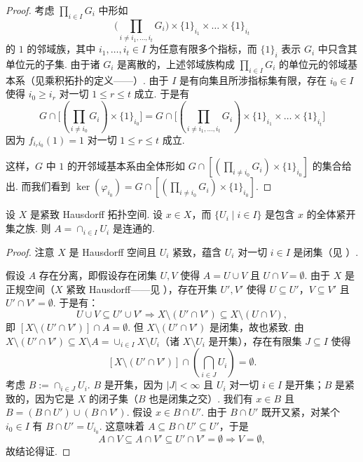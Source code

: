 \begin{proof}
考虑 $\prod_{i\in I}G_i$ 中形如
\[
\bigl(\prod_{i\neq i_1,\ldots,i_t}G_i\bigr)\times\{1\}_{i_1}\times\ldots\times\{1\}_{i_t}
\]
的 $1$ 的邻域族，其中 $i_1,\ldots,i_t\in I$ 为任意有限多个指标，而 $\{1\}_i$ 表示 $G_i$ 中只含其单位元的子集. 由于诸 $G_i$ 是离散的，上述邻域族构成 $\prod_{i\in I}G_i$ 的单位元的邻域基本系（见乘积拓扑的定义——\cite[\S19]{mun75}）. 由于 $I$ 是有向集且所涉指标集有限，存在 $i_0\in I$ 使得 $i_0\geq i_r$ 对一切 $1\leq r\leq t$ 成立. 于是有
\[
G\cap\bigl[(\prod_{i\neq i_0}G_i)\times\{1\}_{i_0}\bigr]=G\cap\bigl[(\prod_{i\neq i_1,\ldots,i_t}G_i)\times\{1\}_{i_1}\times\ldots\times\{1\}_{i_t}\bigr]
\]
因为 $f_{i_ri_0}(1)=1$ 对一切 $1\leq r\leq t$ 成立.

这样，$G$ 中 $1$ 的开邻域基本系由全体形如 $G\cap[(\prod_{i\neq i_0}G_i)\times\{1\}_{i_0}]$ 的集合给出. 而我们看到 $\ker(\varphi_{i_0})=G\cap[(\prod_{i\neq i_0}G_i)\times\{1\}_{i_0}]$.
\end{proof}

\begin{lemma}\label{c3-lem-2-2}
设 $X$ 是紧致 Hausdorff 拓扑空间. 设 $x\in X$，而 $\{U_i\mid i\in I\}$ 是包含 $x$ 的全体紧开集之族. 则 $A=\cap_{i\in I}U_i$ 是连通的.
\end{lemma}

\begin{proof}
注意 $X$ 是 Hausdorff 空间且 $U_i$ 紧致，蕴含 $U_i$ 对一切 $i\in I$ 是闭集（见 \cite[Theorem~26.3]{mun75}）.

假设 $A$ 存在分离，即假设存在闭集 $U,V$ 使得 $A=U\cup V$ 且 $U\cap V=\emptyset$. 由于 $X$ 是正规空间（$X$ 紧致 Hausdorff——见 \cite[Theorem~32.3]{mun75}），存在开集 $U',V'$ 使得 $U\subseteq U'$，$V\subseteq V'$ 且 $U'\cap V'=\emptyset$. 于是有：
\[
U\cup V\subseteq U'\cup V'\Rightarrow X\setminus(U'\cap V')\subseteq X\setminus(U\cap V),
\]
即 $[X\setminus(U'\cap V')]\cap A=\emptyset$. 但 $X\setminus(U'\cap V')$ 是闭集，故也紧致. 由 $X\setminus(U'\cap V')\subseteq X\setminus A=\cup_{i\in I}X\setminus U_i$（诸 $X\setminus U_i$ 是开集），存在有限集 $J\subseteq I$ 使得
\[
[X\setminus(U'\cap V')]\cap(\bigcap_{i\in J}U_i)=\emptyset.
\]
考虑 $B:=\cap_{i\in J}U_i$. $B$ 是开集，因为 $|J|<\infty$ 且 $U_i$ 对一切 $i\in I$ 是开集；$B$ 是紧致的，因为它是 $X$ 的闭子集（$B$ 也是闭集之交）. 我们有 $x\in B$ 且 $B=(B\cap U')\cup(B\cap V')$. 假设 $x\in B\cap U'$. 由于 $B\cap U'$ 既开又紧，对某个 $i_0\in I$ 有 $B\cap U'=U_{i_0}$. 这意味着 $A\subseteq B\cap U'\subseteq U'$，于是
\[
A\cap V\subseteq A\cap V'\subseteq U'\cap V'=\emptyset\Rightarrow V=\emptyset,
\]
故结论得证.
\end{proof}

